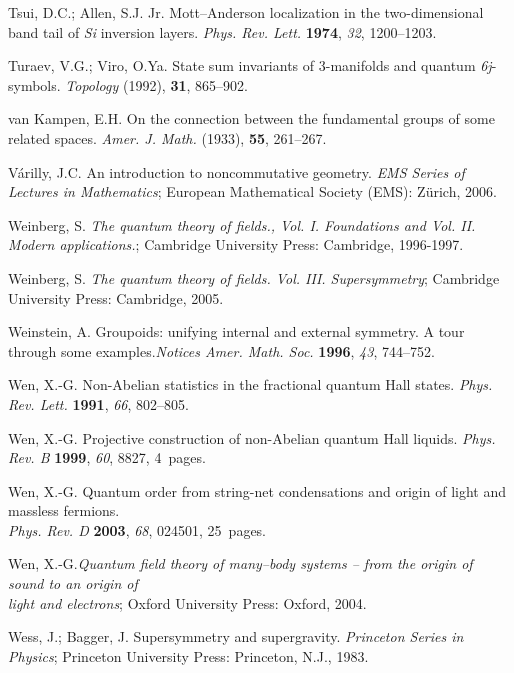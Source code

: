 \documentclass[12pt]{article}
\theoremstyle{plain}
\theoremstyle{definition}
\numberwithin{equation}{section}
\begin{document}
\begin{thebibliography}{99}
Tsui, D.C.; Allen, S.J. Jr. Mott--Anderson localization in the two-dimensional band tail of {\em Si} inversion layers. {\em Phys. Rev. Lett.} {\bf 1974}, {\em 32}, 1200--1203.

Turaev, V.G.; Viro, O.Ya. State sum invariants of 3-manifolds and quantum {\em 6j}-symbols. \emph{Topology} (1992), {\bf 31}, 865--902.

van Kampen, E.H. On the connection between the fundamental groups of some related spaces. \emph{Amer. J. Math.} (1933), {\bf 55}, 261--267.

V\'{a}rilly, J.C. An introduction to noncommutative geometry. {\em EMS Series of Lectures in Mathematics}; European Mathematical Society (EMS): Z\"{u}rich, 2006.

Weinberg, S. {\em The quantum theory of fields., Vol. I. Foundations and Vol. II. Modern applications.}; Cambridge University Press: Cambridge, 1996-1997.

Weinberg, S. {\em The quantum theory of fields. Vol. III. Supersymmetry}; Cambridge University Press: Cambridge, 2005.

Weinstein, A. Groupoids: unifying internal and external symmetry. A tour through some examples.{\em Notices Amer. Math. Soc.} {\bf 1996}, {\em 43}, 744--752.

Wen, X.-G. Non-Abelian statistics in the fractional quantum Hall states. {\em Phys. Rev. Lett.} {\bf 1991}, {\em 66}, 802--805.

Wen, X.-G. Projective construction of non-Abelian quantum Hall liquids. {\em Phys. Rev. B} {\bf 1999}, {\em 60}, 8827, 4~pages. %

Wen, X.-G. Quantum order from string-net condensations and origin of light and massless fermions.\\ {\em Phys. Rev. D} {\bf 2003}, {\em 68}, 024501, 25~pages. %

Wen, X.-G.{\em Quantum field theory of many--body systems -- from the origin of sound to an origin of\\ light and electrons}; Oxford University Press: Oxford, 2004.

Wess, J.; Bagger, J. Supersymmetry and supergravity. {\em Princeton Series in Physics}; Princeton University Press: Princeton, N.J., 1983.


\end{thebibliography}
\end{document}
